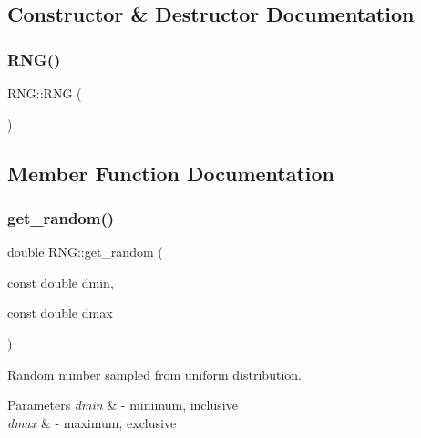 \subsection{Constructor \& Destructor Documentation}
\mbox{\label{classRNG_a0028b717ff3d402a5829fc09ab1c5ed4}} 
\subsubsection{\texorpdfstring{R\+N\+G()}{RNG()}}
{\footnotesize\ttfamily R\+N\+G\+::\+R\+NG (\begin{DoxyParamCaption}{ }\end{DoxyParamCaption})\hspace{0.3cm}{\ttfamily [inline]}}



\subsection{Member Function Documentation}
\mbox{\label{classRNG_a9c2ed7323632e3bade78543f3455d055}} 
\subsubsection{\texorpdfstring{get\+\_\+random()}{get\_random()}}
{\footnotesize\ttfamily double R\+N\+G\+::get\+\_\+random (\begin{DoxyParamCaption}\item[{const double}]{dmin,  }\item[{const double}]{dmax }\end{DoxyParamCaption})\hspace{0.3cm}{\ttfamily [inline]}}



Random number sampled from uniform distribution. 


\begin{DoxyParams}{Parameters}
{\em dmin} & -\/ minimum, inclusive \\
\hline
{\em dmax} & -\/ maximum, exclusive \\
\hline
\end{DoxyParams}
\mbox{\label{classRNG_ad4c8f00da1722cad6c57873ecc45187d}} 
